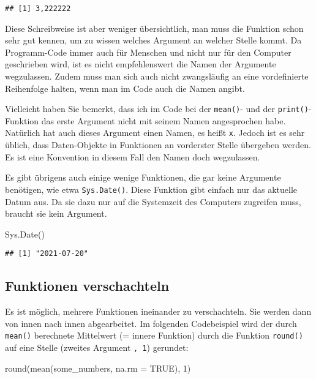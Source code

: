 \documentclass[
]{book}
\newenvironment{Shaded}{\begin{snugshade}}{\end{snugshade}}
\newcommand{\AttributeTok}[1]{\textcolor[rgb]{0.77,0.63,0.00}{#1}}
\newcommand{\ConstantTok}[1]{\textcolor[rgb]{0.00,0.00,0.00}{#1}}
\newcommand{\DecValTok}[1]{\textcolor[rgb]{0.00,0.00,0.81}{#1}}
\newcommand{\FunctionTok}[1]{\textcolor[rgb]{0.00,0.00,0.00}{#1}}
\newcommand{\NormalTok}[1]{#1}
\begin{document}
\begin{verbatim}
## [1] 3,222222
\end{verbatim}

Diese Schreibweise ist aber weniger übersichtlich, man muss die Funktion schon sehr gut kennen, um zu wissen welches Argument an welcher Stelle kommt. Da Programm-Code immer auch für Menschen und nicht nur für den Computer geschrieben wird, ist es nicht empfehlenswert die Namen der Argumente wegzulassen. Zudem muss man sich auch nicht zwangsläufig an eine vordefinierte Reihenfolge halten, wenn man im Code auch die Namen angibt.

Vielleicht haben Sie bemerkt, dass ich im Code bei der \texttt{mean()}- und der \texttt{print()}-Funktion das erste Argument nicht mit seinem Namen angesprochen habe. Natürlich hat auch dieses Argument einen Namen, es heißt \texttt{x}. Jedoch ist es sehr üblich, dass Daten-Objekte in Funktionen an vorderster Stelle übergeben werden. Es ist eine Konvention in diesem Fall den Namen doch wegzulassen.

Es gibt übrigens auch einige wenige Funktionen, die gar keine Argumente benötigen, wie etwa \texttt{Sys.Date()}. Diese Funktion gibt einfach nur das aktuelle Datum aus. Da sie dazu nur auf die Systemzeit des Computers zugreifen muss, braucht sie kein Argument.

\begin{Shaded}
\begin{Highlighting}[]
\FunctionTok{Sys.Date}\NormalTok{()}
\end{Highlighting}
\end{Shaded}

\begin{verbatim}
## [1] "2021-07-20"
\end{verbatim}

\hypertarget{funktionen-verschachteln}{%
\subsection{Funktionen verschachteln}\label{funktionen-verschachteln}}

Es ist möglich, mehrere Funktionen ineinander zu verschachteln. Sie werden dann von innen nach innen abgearbeitet. Im folgenden Codebeispiel wird der durch \texttt{mean()} berechnete Mittelwert (= innere Funktion) durch die Funktion \texttt{round()} auf eine Stelle (zweites Argument \texttt{,\ 1}) gerundet:

\begin{Shaded}
\begin{Highlighting}[]
\FunctionTok{round}\NormalTok{(}\FunctionTok{mean}\NormalTok{(some\_numbers, }\AttributeTok{na.rm =} \ConstantTok{TRUE}\NormalTok{), }\DecValTok{1}\NormalTok{)}
\end{Highlighting}
\end{Shaded}
\end{document}
